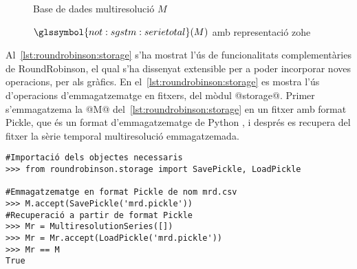 \begin{figure}[tp]
  \centering
   \caption{Base de dades multiresolució $M$}
   \label{fig:python:BDMm}
\end{figure}

\begin{figure}[tp]
  \centering
   \caption{$\glssymbol{not:sgstm:serietotal}(M)$ amb representació \gls{zohe}}
   \label{fig:python:BDMmtotal}
\end{figure}



Al~\autoref{lst:roundrobinson:storage} s'ha mostrat l'ús de
funcionalitats complementàries de RoundRobinson, el qual s'ha
dissenyat extensible per a poder incorporar noves operacions, per als
gràfics.  En el~\autoref{lst:roundrobinson:storage} es mostra l'ús
d'operacions d'emmagatzematge en fitxers, del mòdul @storage@. Primer
s'emmagatzema la @M@ del~\autoref{lst:roundrobinson:storage} en un
fitxer amb format Pickle, que és un format d'emmagatzematge de
Python \parencite{python:doc2}, i després es recupera del fitxer la
sèrie temporal multiresolució emmagatzemada. 
\begin{lstlisting}[style=py,caption=Operacions complementàries de RoundRobinson per a l'emmagatzematge,label=lst:roundrobinson:storage]
#Importació dels objectes necessaris
>>> from roundrobinson.storage import SavePickle, LoadPickle

#Emmagatzematge en format Pickle de nom mrd.csv
>>> M.accept(SavePickle('mrd.pickle'))
#Recuperació a partir de format Pickle
>>> Mr = MultiresolutionSeries([])
>>> Mr = Mr.accept(LoadPickle('mrd.pickle'))
>>> Mr == M
True
\end{lstlisting}


